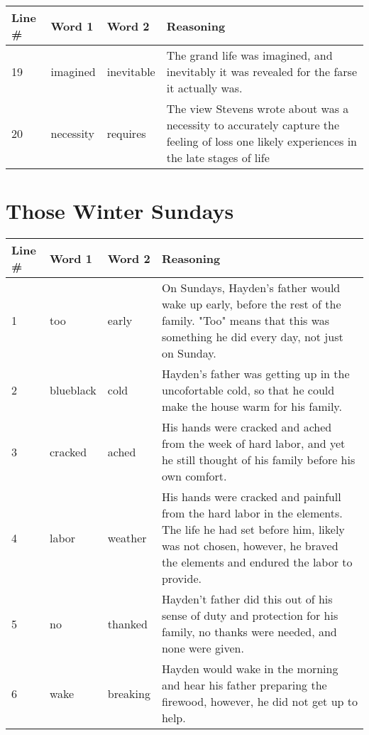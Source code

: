 \documentclass[a4paper,12pt]{article}
\begin{document}
\begin{center}
	\begin{tabular}{|l|l|l|p{2.5in}|}
	\hline
	Line \#& Word 1 & Word 2 & Reasoning \\ \hline
	19&imagined&inevitable&The grand life was imagined, and inevitably it was revealed for the farse it actually was.\\ \hline
	20&necessity&requires&The view Stevens wrote about was a necessity to accurately capture the feeling of loss one likely experiences in the late stages of life\\ \hline
	\end{tabular}
\end{center} 
\section*{Those Winter Sundays}
\begin{center}
	\begin{tabular}{|l|l|l|p{2.5in}|}
	\hline
	Line \#& Word 1 & Word 2 & Reasoning \\ \hline
	1&too&early&On Sundays, Hayden's father would wake up early, before the rest of the family.  "Too" means that this was something he did every day, not just on Sunday.\\ \hline
	2&blueblack&cold&Hayden's father was getting up in the uncofortable cold, so that he could make the house warm for his family.\\ \hline
	3&cracked&ached&His hands were cracked and ached from the week of hard labor, and yet he still thought of his family before his own comfort.\\ \hline
	4&labor&weather&His hands were cracked and painfull from the hard labor in the elements.  The life he had set before him, likely was not chosen, however, he braved the elements and endured the labor to provide.\\ \hline
	5&no&thanked&Hayden't father did this out of his sense of duty and protection for his family, no thanks were needed, and none were given.\\ \hline
	6&wake&breaking&Hayden would wake in the morning and hear his father preparing the firewood, however, he did not get up to help.\\ \hline
	\end{tabular}
\end{center}
\end{document}
